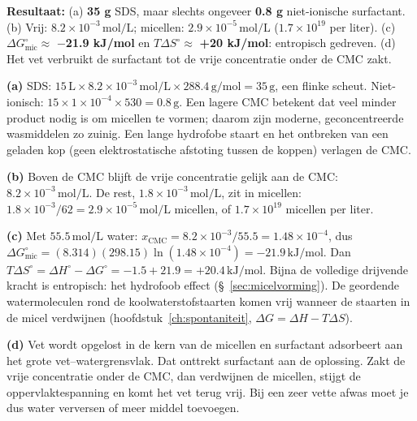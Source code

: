 \begin{oplossing}
\textbf{Resultaat:} (a) \textbf{35 g} SDS, maar slechts ongeveer \textbf{0.8 g} niet-ionische surfactant. (b) Vrij: \textbf{\(8.2\times10^{-3}\,\mathrm{mol/L}\)}; micellen: \textbf{\(2.9\times10^{-5}\,\mathrm{mol/L}\)} (\(1.7\times10^{19}\) per liter). (c) \(\Delta G^\circ_{\text{mic}} \approx\) \textbf{\ensuremath{-}21.9 kJ/mol} en \(T\Delta S^\circ \approx\) \textbf{+20 kJ/mol}: entropisch gedreven. (d) Het vet verbruikt de surfactant tot de vrije concentratie onder de CMC zakt.

\textbf{(a)} SDS: \(15\,\mathrm{L} \times 8.2\times10^{-3}\,\mathrm{mol/L} \times 288.4\,\mathrm{g/mol} = 35\,\mathrm{g}\), een flinke scheut. Niet-ionisch: \(15 \times 1\times10^{-4} \times 530 = 0.8\,\mathrm{g}\). Een lagere CMC betekent dat veel minder product nodig is om micellen te vormen; daarom zijn moderne, geconcentreerde wasmiddelen zo zuinig. Een lange hydrofobe staart en het ontbreken van een geladen kop (geen elektrostatische afstoting tussen de koppen) verlagen de CMC.

\textbf{(b)} Boven de CMC blijft de vrije concentratie gelijk aan de CMC: \(8.2\times10^{-3}\,\mathrm{mol/L}\). De rest, \(1.8\times10^{-3}\,\mathrm{mol/L}\), zit in micellen: \(1.8\times10^{-3}/62 = 2.9\times10^{-5}\,\mathrm{mol/L}\) micellen, of \(1.7\times10^{19}\) micellen per liter.

\textbf{(c)} Met \(55.5\,\mathrm{mol/L}\) water: \(x_{\text{CMC}} = 8.2\times10^{-3}/55.5 = 1.48\times10^{-4}\), dus \(\Delta G^\circ_{\text{mic}} = (8.314)(298.15)\ln(1.48\times10^{-4}) = -21.9\,\mathrm{kJ/mol}\). Dan \(T\Delta S^\circ = \Delta H^\circ - \Delta G^\circ = -1.5 + 21.9 = +20.4\,\mathrm{kJ/mol}\). Bijna de volledige drijvende kracht is entropisch: het hydrofoob effect (\S~\ref{sec:micelvorming}). De geordende watermoleculen rond de koolwaterstofstaarten komen vrij wanneer de staarten in de micel verdwijnen (hoofdstuk~\ref{ch:spontaniteit}, \(\Delta G = \Delta H - T\Delta S\)).

\textbf{(d)} Vet wordt opgelost in de kern van de micellen en surfactant adsorbeert aan het grote vet--watergrensvlak. Dat onttrekt surfactant aan de oplossing. Zakt de vrije concentratie onder de CMC, dan verdwijnen de micellen, stijgt de oppervlaktespanning en komt het vet terug vrij. Bij een zeer vette afwas moet je dus water verversen of meer middel toevoegen.
\end{oplossing}

